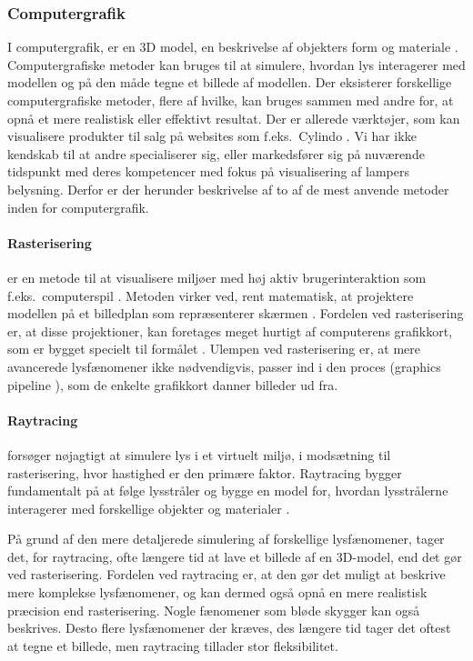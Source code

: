 \subsubsection{Computergrafik}
\label{sec:computergrafik}
I computergrafik, er en 3D model, en beskrivelse af objekters form og materiale \cite{computergrafik_introduktion}. Computergrafiske metoder kan bruges til at simulere, hvordan lys interagerer med modellen og på den måde tegne et billede af modellen. Der eksisterer forskellige computergrafiske metoder, flere af hvilke, kan bruges sammen med andre for, at opnå et mere realistisk eller effektivt resultat. Der er allerede værktøjer, som kan visualisere produkter til salg på websites som f.eks.\ Cylindo \cite{Cylindo}. Vi har ikke kendskab til at andre specialiserer sig, eller markedsfører sig på nuværende tidspunkt med deres kompetencer med fokus på visualisering af lampers belysning. Derfor er der herunder beskrivelse af to af de mest anvende metoder inden for computergrafik.

\paragraph{Rasterisering}
er en metode til at visualisere miljøer med høj aktiv brugerinteraktion som f.eks.\ computerspil \cite{rastarization}. Metoden virker ved, rent matematisk, at projektere modellen på et billedplan som repræsenterer skærmen \cite{rastarization}. Fordelen ved rasterisering er, at disse projektioner, kan foretages meget hurtigt af computerens grafikkort, som er bygget specielt til formålet \cite{rastarization}. Ulempen ved rasterisering er, at mere avancerede lysfænomener ikke nødvendigvis, passer ind i den proces (graphics pipeline \cite{rastarization}), som de enkelte grafikkort danner billeder ud fra. 

\paragraph{Raytracing} forsøger nøjagtigt at simulere lys i et virtuelt miljø, i modsætning til rasterisering, hvor hastighed er den primære faktor. Raytracing bygger fundamentalt på at følge lysstråler og bygge en model for, hvordan lysstrålerne interagerer med forskellige objekter og materialer \cite{raytracing_for_begyndere}. 

På grund af den mere detaljerede simulering af forskellige lysfænomener, tager det, for raytracing, ofte længere tid at lave et billede af en 3D-model, end det gør ved rasterisering. Fordelen ved raytracing er, at den gør det muligt at beskrive mere komplekse lysfænomener, og kan dermed også opnå en mere realistisk præcision end rasterisering\cite{raytracingvsrastarizatioin}. Nogle fænomener som bløde skygger kan også beskrives\cite{softshadow}. Desto flere lysfænomener der kræves, des længere tid tager det oftest at tegne et billede, men raytracing tillader stor fleksibilitet.